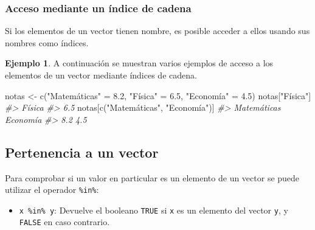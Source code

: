 \documentclass[
]{book}
\newenvironment{Shaded}{\begin{snugshade}}{\end{snugshade}}
\newcommand{\CommentTok}[1]{\textcolor[rgb]{0.56,0.35,0.01}{\textit{#1}}}
\newcommand{\FloatTok}[1]{\textcolor[rgb]{0.00,0.00,0.81}{#1}}
\newcommand{\FunctionTok}[1]{\textcolor[rgb]{0.00,0.00,0.00}{#1}}
\newcommand{\NormalTok}[1]{#1}
\newcommand{\OtherTok}[1]{\textcolor[rgb]{0.56,0.35,0.01}{#1}}
\newcommand{\StringTok}[1]{\textcolor[rgb]{0.31,0.60,0.02}{#1}}
\providecommand{\tightlist}{%
  \setlength{\itemsep}{0pt}\setlength{\parskip}{0pt}}
\theoremstyle{definition}
\theoremstyle{definition}
\newtheorem{example}{Ejemplo}[chapter]
\theoremstyle{definition}
\theoremstyle{definition}
\theoremstyle{remark}
\begin{document}
\hypertarget{acceso-mediante-un-uxedndice-de-cadena}{%
\subsubsection{Acceso mediante un índice de cadena}\label{acceso-mediante-un-uxedndice-de-cadena}}

Si los elementos de un vector tienen nombre, es posible acceder a ellos usando sus nombres como índices.

\begin{example}

A continuación se muestran varios ejemplos de acceso a los elementos de un vector mediante índices de cadena.

\begin{Shaded}
\begin{Highlighting}[]
\NormalTok{notas }\OtherTok{\textless{}{-}} \FunctionTok{c}\NormalTok{(}\StringTok{"Matemáticas"} \OtherTok{=} \FloatTok{8.2}\NormalTok{, }\StringTok{"Física"} \OtherTok{=} \FloatTok{6.5}\NormalTok{, }\StringTok{"Economía"} \OtherTok{=} \FloatTok{4.5}\NormalTok{)}
\NormalTok{notas[}\StringTok{"Física"}\NormalTok{]}
\CommentTok{\#\textgreater{} Física }
\CommentTok{\#\textgreater{}    6.5}
\NormalTok{notas[}\FunctionTok{c}\NormalTok{(}\StringTok{"Matemáticas"}\NormalTok{, }\StringTok{"Economía"}\NormalTok{)]}
\CommentTok{\#\textgreater{} Matemáticas    Economía }
\CommentTok{\#\textgreater{}         8.2         4.5}
\end{Highlighting}
\end{Shaded}

\end{example}

\hypertarget{pertenencia-a-un-vector}{%
\subsection{Pertenencia a un vector}\label{pertenencia-a-un-vector}}

Para comprobar si un valor en particular es un elemento de un vector se puede utilizar el operador \texttt{\%in\%}:

\begin{itemize}
\tightlist
\item
  \texttt{x\ \%in\%\ y}: Devuelve el booleano \texttt{TRUE} si \texttt{x} es un elemento del vector \texttt{y}, y \texttt{FALSE} en caso contrario.
\end{itemize}
\end{document}
